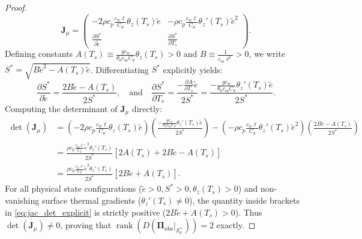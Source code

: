 \begin{proof}
\begin{equation}
\mathbf{J}_{\mu} =
\begin{pmatrix}
-2 \rho c_p \frac{c_w \ell}{C_\theta} \theta_z(T_s) \tilde e & -\rho c_p \frac{c_w \ell}{C_\theta} \theta_z'(T_s) \tilde e^2 \\[6pt]
\frac{\partial S^*}{\partial \tilde e} & \frac{\partial S^*}{\partial T_s}
\end{pmatrix}.
\end{equation}
Defining constants $A(T_s) \equiv \frac{g c_w}{\theta_0 c_m C_\theta} \theta_z(T_s) > 0$ and $B \equiv \frac{1}{c_m \ell^2} > 0$, we write $S^* = \sqrt{B \tilde e^2 - A(T_s) \tilde e}$. Differentiating $S^*$ explicitly yields:
\begin{equation}
\frac{\partial S^*}{\partial \tilde e} = \frac{2 B \tilde e - A(T_s)}{2 S^*}, \quad \text{and} \quad \frac{\partial S^*}{\partial T_s} = \frac{-\frac{\partial A}{\partial T_s} \tilde e}{2 S^*} = \frac{-\frac{g c_w}{\theta_0 c_m C_\theta} \theta_z'(T_s) \tilde e}{2 S^*}.
\end{equation}
Computing the determinant of $\mathbf{J}_{\mu}$ directly:
\begin{align}
\det(\mathbf{J}_{\mu}) &= \left(-2 \rho c_p \frac{c_w \ell}{C_\theta} \theta_z(T_s) \tilde e\right) \left( \frac{-\frac{g c_w}{\theta_0 c_m C_\theta} \theta_z'(T_s) \tilde e}{2 S^*} \right) - \left(-\rho c_p \frac{c_w \ell}{C_\theta} \theta_z'(T_s) \tilde e^2\right) \left( \frac{2 B \tilde e - A(T_s)}{2 S^*} \right) \nonumber \\
&= \frac{\rho c_p \frac{c_w \ell}{C_\theta} \tilde e^2 \theta_z'(T_s)}{2 S^*} \left[ 2 A(T_s) + 2 B \tilde e - A(T_s) \right] \nonumber \\
&= \frac{\rho c_p \frac{c_w \ell}{C_\theta} \tilde e^2 \theta_z'(T_s)}{2 S^*} \left[ 2 B \tilde e + A(T_s) \right].
\label{eq:jac_det_explicit}
\end{align}
For all physical state configurations ($\tilde e > 0, S^* > 0, \theta_z(T_s) > 0$) and non-vanishing surface thermal gradients ($\theta_z'(T_s) \neq 0$), the quantity inside brackets in \eqref{eq:jac_det_explicit} is strictly positive ($2 B \tilde e + A(T_s) > 0$). Thus $\det(\mathbf{J}_{\mu}) \neq 0$, proving that $\operatorname{rank}\left(D\left(\boldsymbol{\Pi}_{\mathrm{obs}}\vert_{\mathcal{S}_0^+}\right)\right) = 2$ exactly.
\end{proof}

